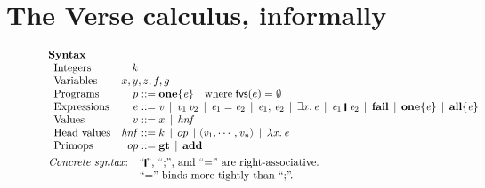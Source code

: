 \documentclass[acmsmall,review,dvipsnames]{acmart}
\newcommand{\Varid}[1]{\mathit{#1}}
\newif\iffullverse
\newcommand{\vb}{\; \ensuremath{\mathop{\mid}} \;}    %
\newcommand{\freevars}[1]{\mathsf{fvs}(#1)}
\newcommand{\hnf}{\mathit{hnf}}  %
\begin{document}

\section{The Verse calculus, informally} \label{sec:informal}

\begin{figure}
  $$
  \begin{array}{l}
    \textbf{Syntax} \\
    \begin{array}{lr@{\;}c@{\;}l}
    \text{Integers} & k \\
    \text{Variables} & \multicolumn{3}{l}{x,y,z,f,g} \\
    \text{Programs} & p  & ::=  & \ensuremath{\textbf{one}\{\Varid{e}\}} \quad \text{where} \; \freevars{e} = \emptyset \\
    \text{Expressions} & e  & ::=  & \ensuremath{\Varid{v}} \vb \ensuremath{\Varid{v}_{\mathrm{1}}\,\Varid{v}_{\mathrm{2}}}
       \vb \ensuremath{\Varid{e}_{\mathrm{1}}=\Varid{e}_{\mathrm{2}}} \vb \ensuremath{\Varid{e}_{\mathrm{1}};\,\Varid{e}_{\mathrm{2}}} \vb  \ensuremath{\exists\Varid{x}.\,\Varid{e}} 
    \vb  \ensuremath{\Varid{e}_{\mathrm{1}}\;\rule[-0.3mm]{0.5mm}{2.5mm}\;\Varid{e}_{\mathrm{2}}} \vb \ensuremath{\textbf{fail}} \vb \ensuremath{\textbf{one}\{\Varid{e}\}} \vb \ensuremath{\textbf{all}\{\Varid{e}\}} \\
\iffullverse
    && \vb & \ensuremath{\textbf{succeeds}\,\{\Varid{e}\}} \vb \ensuremath{\textbf{decides}\,\{\Varid{e}\}} \\
\fi
    \text{Values} & v & ::= & x  \vb \hnf \\
    \text{Head values} & \hnf & ::= & k \vb op \vb \ensuremath{\langle\Varid{v}_{\mathrm{1}},\cdots,\Varid{v}_{\Varid{n}}\rangle} \vb \ensuremath{\lambda\Varid{x}.\,\Varid{e}} \\
    \text{Primops} & op  & ::= & \ensuremath{\textbf{gt}} \vb \ensuremath{\textbf{add}}
\iffullverse
    \vb \ensuremath{\textbf{isInt}}
\fi
    \end{array} \\
    \\[-3mm]
    \text{\emph{Concrete syntax}:} \;\;
    \begin{array}[t]{l}
          \text{``\ensuremath{\rule[-0.3mm]{0.5mm}{2.5mm}}'', ``;'', and ``\ensuremath{\mathrel{=}}'' are right-associative.} \\
          \text{``\ensuremath{\mathrel{=}}'' binds more tightly than ``;''.} \\

\end{array}
\end{array}$$
\end{figure}
\end{document}
